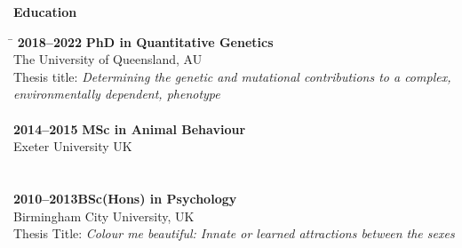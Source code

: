 \documentclass[a4paper,11pt,english]{article}
\newcommand{\sepspace}{\vspace*{1em}}
\newcommand{\work}[4]{
	\noindent\textbf{#2}
	\hfill 
	\hfill 
	\noindent\textbf{#1}
	
	\hfill
	\noindent \textit{#3} \par
    \vspace*{0.5em}
	\noindent\hangindent=2em\hangafter=0 \small #4
	\normalsize \par}
\begin{document}




\flushleft\selectfont\Large\textbf{Education}
\sectionrule{0pt}{0pt}{-5pt}{1pt}
\normalsize\normalfont
\begin{tabbing}
	\hspace{2in}\=\kill
	\textbf{2018--2022} \> \textbf{PhD in Quantitative Genetics }  \\
	\> The University of Queensland, AU    \\
	\> {Thesis title: \textit {Determining the genetic and mutational contributions to a complex, environmentally dependent, phenotype}}    \\
	\>  \\  %
	\textbf{2014--2015} \> \textbf{MSc in Animal Behaviour}       \\
	\> Exeter University UK  \\
	  \\
	\>   \\
	\textbf{2010--2013}\>\textbf{BSc(Hons) in Psychology}  \\
	\> Birmingham City University, UK   \\
	\> {Thesis Title: \textit {Colour me beautiful: Innate or learned 
		attractions between the sexes }}  \\
	\>   \\                                         
\end{tabbing}
\end{document}
